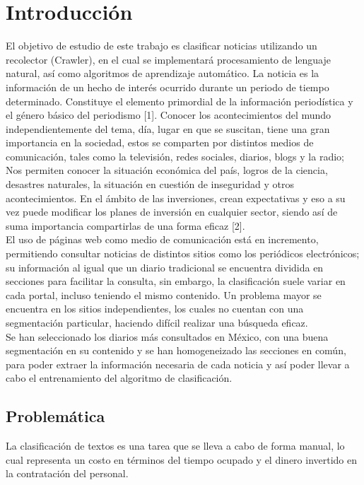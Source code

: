 
\chapter{Introducción}


El objetivo de estudio de este trabajo es clasificar noticias utilizando un recolector (Crawler), en el cual se implementará procesamiento de lenguaje natural, así como algoritmos de aprendizaje automático. La noticia es la información de un hecho de interés ocurrido durante un periodo de tiempo determinado. Constituye el elemento primordial de la información periodística y el género básico del periodismo [1]. Conocer los acontecimientos del mundo independientemente del tema, día, lugar en que se suscitan, tiene una gran importancia en la sociedad, estos se comparten por distintos medios de comunicación, tales como la televisión, redes sociales, diarios, blogs y la radio; Nos permiten conocer la situación económica del país, logros de la ciencia, desastres naturales, la situación en cuestión de inseguridad y otros acontecimientos. En el ámbito de las inversiones, crean expectativas y eso a su vez puede modificar los planes de inversión en cualquier sector, siendo así de suma importancia compartirlas de una forma eficaz [2].\\

El uso de páginas web como medio de comunicación está en incremento, permitiendo consultar noticias de distintos sitios como los periódicos electrónicos; su información al igual que un diario tradicional se encuentra dividida en secciones para facilitar la consulta, sin embargo, la clasificación suele variar en cada portal, incluso teniendo el mismo contenido. Un problema mayor se encuentra en los sitios independientes, los cuales no cuentan con una segmentación particular, haciendo difícil realizar una búsqueda eficaz.\\

Se han seleccionado los diarios más consultados en México, con una buena
segmentación en su contenido y se han homogeneizado las secciones en común, para poder extraer la información necesaria de cada noticia y así poder llevar a cabo el entrenamiento del algoritmo de clasificación.


\section{Problemática}

La clasificación de textos es una tarea que se lleva a cabo de forma manual, lo cual representa un costo en términos del tiempo ocupado y el dinero invertido en la contratación del personal.\\


